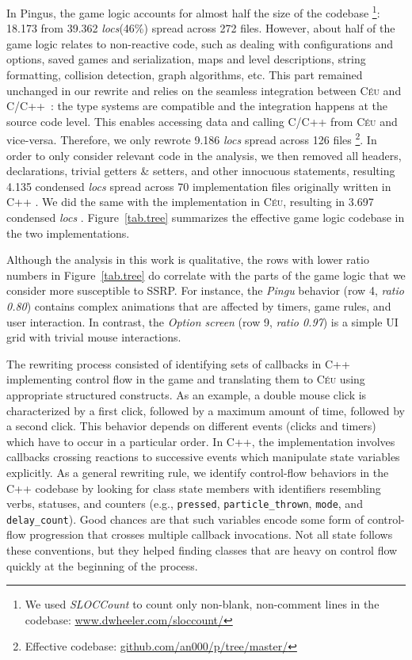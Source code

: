 \documentclass[10pt, conference, compsocconf]{IEEEtran}
\newcommand{\CEU}{\textsc{C\'{e}u}\xspace}
\newcommand{\locs}{\emph{locs}\xspace}
\newcommand{\code}[1] {{\small{\texttt{#1}}}}
\begin{document}
In Pingus, the game logic accounts for almost half the size of the codebase%
\footnote{
We used \emph{SLOCCount} to count only non-blank, non-comment lines in the
codebase: \url{www.dwheeler.com/sloccount/}
}:
18.173 from 39.362 \locs (46\%) spread across 272 files.
%
However, about half of the game logic relates to non-reactive code, such as
dealing with configurations and options, saved games and serialization, maps
and level descriptions, string formatting, collision detection, graph
algorithms, etc.
This part remained unchanged in our rewrite and relies on the seamless
integration between \CEU and C/C++~\cite{ceu.sensys13}: the type systems are
compatible and the integration happens at the source code level.
This enables accessing data and calling C/C++ from \CEU and vice-versa.
%
Therefore, we only rewrote 9.186 \locs spread across 126 files%
\footnote{\label{codebase} Effective codebase: \url{github.com/an000/p/tree/master/}}.
%
In order to only consider relevant code in the analysis, we then removed all
headers, declarations, trivial getters \& setters, and other innocuous
statements, resulting 4.135 condensed \locs spread across 70 implementation
files originally written in C++%
\footnotemark[\ref{codebase}].
We did the same with the implementation in \CEU, resulting in 3.697 condensed
\locs%
\footnotemark[\ref{codebase}].
%
Figure~\ref{tab.tree} summarizes the effective game logic codebase in the two
implementations.

Although the analysis in this work is qualitative, the rows with lower ratio
numbers in Figure~\ref{tab.tree} do correlate with the parts of the game
logic that we consider more susceptible to SSRP.
For instance, the \emph{Pingu} behavior (row 4, \emph{ratio 0.80}) contains
complex animations that are affected by timers, game rules, and user
interaction.
In contrast, the \emph{Option screen} (row 9, \emph{ratio 0.97}) is a simple UI
grid with trivial mouse interactions.

The rewriting process consisted of identifying sets of callbacks in C++
implementing control flow in the game and translating them to \CEU using
appropriate structured constructs.
%
As an example, a double mouse click is characterized by a first click, followed
by a maximum amount of time, followed by a second click.
This behavior depends on different events (clicks and timers) which have to
occur in a particular order.
In C++, the implementation involves callbacks crossing reactions to successive
events which manipulate state variables explicitly.
%
As a general rewriting rule, we identify control-flow behaviors in the C++
codebase by looking for class state members with identifiers resembling verbs,
statuses, and counters (e.g.,
\code{pressed},
\code{particle\_thrown},
\code{mode}, and
\code{delay\_count}).
Good chances are that such variables encode some form of control-flow
progression that crosses multiple callback invocations.
%
Not all state follows these conventions, but they helped finding classes that
are heavy on control flow quickly at the beginning of the process.
\end{document}
